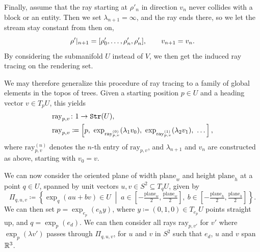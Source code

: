 Finally, assume that the ray starting at $\rho'_n$ in direction $v_n$ never
collides with a block or an entity. Then we set $\lambda_{n+1} = \infty$, and
the ray ends there, so we let the stream stay constant from then on,
\[
	\rho'|_{n+1} = [\rho'_0, \dots, \rho'_n, \rho'_n],
	\qquad
	v_{n+1} = v_n.
\]
By considering the submanifold $U$ instead of $V$, we then get the induced ray
tracing on the rendering set.

We may therefore generalize this procedure of ray tracing to a family of
global elements in the topos of trees. Given a starting position $p \in U$ and
a heading vector $v \in T_p U$, this yields
\begin{align*}
	\mathrm{ray}_{p,v} & \colon 1 \to \texttt{Str}(U), \\
	\mathrm{ray}_{p,v} & \coloneqq \left[p,\
		\exp_{\mathrm{ray}_{p,v}^{(0)}}(\lambda_1 v_0),\
		\exp_{\mathrm{ray}_{p,v}^{(1)}}(\lambda_2 v_1),\
	\dots\right],
\end{align*}
where $\mathrm{ray}_{p,v}^{(n)}$ denotes the $n$-th entry of
$\mathrm{ray}_{p,v}$, and $\lambda_{n+1}$ and $v_n$ are constructed as above,
starting with $v_0 = v$.

We can now consider the oriented plane of width $\mathrm{plane}_w$ and height
$\mathrm{plane}_h$ at a point $q \in U$, spanned by unit vectors
$u, v \in S^2 \subseteq T_q U$, given by
\[
	\Pi_{q,u,v} \coloneqq \left\{ \exp_q(a u + b v) \in U \;\middle|\;
	a \in \left[-\tfrac{\mathrm{plane}_w}{2}, \tfrac{\mathrm{plane}_w}{2}\right],\
	b \in \left[-\tfrac{\mathrm{plane}_h}{2}, \tfrac{\mathrm{plane}_h}{2}\right]
	\right\}.
\]
We can then set $p = \exp_{e_p}(e_h y)$, where $y \coloneqq (0,1,0) \in T_{e_p} U$
points straight up, and $q = \exp_p(e_d)$. We can then consider all rays
$\mathrm{ray}_{p,v'}$ for $v'$ where $\exp_p(\lambda v')$ passes through
$\Pi_{q,u,v}$, for $u$ and $v$ in $S^2$ such that $e_d$, $u$ and $v$ span
$\mathbb{R}^3$.

